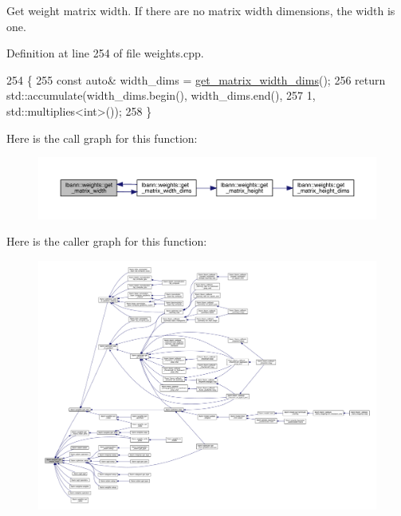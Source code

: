 Get weight matrix width. If there are no matrix width dimensions, the width is one. 

Definition at line 254 of file weights.\+cpp.


\begin{DoxyCode}
254                                     \{
255   \textcolor{keyword}{const} \textcolor{keyword}{auto}& width\_dims = \hyperlink{classlbann_1_1weights_a783ce38ed0b75c0264dd7e28911d5ec0}{get\_matrix\_width\_dims}();
256   \textcolor{keywordflow}{return} std::accumulate(width\_dims.begin(), width\_dims.end(),
257                          1, std::multiplies<int>());
258 \}
\end{DoxyCode}
Here is the call graph for this function\+:\nopagebreak
\begin{figure}[H]
\begin{center}
\leavevmode
\includegraphics[width=350pt]{classlbann_1_1weights_abc3cf3a5b992302b1eaaea1fdf3b377d_cgraph}
\end{center}
\end{figure}
Here is the caller graph for this function\+:\nopagebreak
\begin{figure}[H]
\begin{center}
\leavevmode
\includegraphics[width=350pt]{classlbann_1_1weights_abc3cf3a5b992302b1eaaea1fdf3b377d_icgraph}
\end{center}
\end{figure}
\mbox{\label{classlbann_1_1weights_a783ce38ed0b75c0264dd7e28911d5ec0}} 
